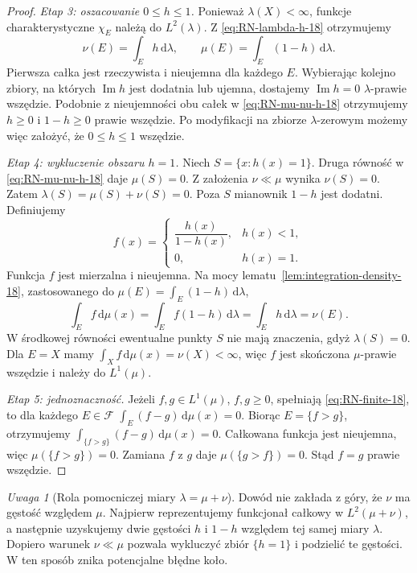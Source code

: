 \documentclass[11pt,a4paper,oneside]{book}
\numberwithin{equation}{chapter}
\theoremstyle{plain}
\theoremstyle{definition}
\theoremstyle{remark}
\newtheorem{uwaga}[twierdzenie]{Uwaga}
\begin{document}
\begin{proof}
\emph{Etap 3: oszacowanie $0\le h\le1$.}
Ponieważ $\lambda(X)<\infty$, funkcje charakterystyczne $\chi_E$
należą do $L^2(\lambda)$. Z \eqref{eq:RN-lambda-h-18}
otrzymujemy
\begin{equation}\label{eq:RN-mu-nu-h-18}
\nu(E)=\int_Eh\,\mathrm d\lambda,\qquad
\mu(E)=\int_E(1-h)\,\mathrm d\lambda.
\end{equation}
Pierwsza całka jest rzeczywista i nieujemna dla
każdego $E$. Wybierając kolejno zbiory, na których
$\operatorname{Im}h$ jest dodatnia lub ujemna,
dostajemy $\operatorname{Im}h=0$ $\lambda$-prawie wszędzie.
Podobnie z nieujemności obu całek w
\eqref{eq:RN-mu-nu-h-18} otrzymujemy
$h\ge0$ i $1-h\ge0$ prawie wszędzie.
Po modyfikacji na zbiorze $\lambda$-zerowym możemy
więc założyć, że $0\le h\le1$ wszędzie.

\emph{Etap 4: wykluczenie obszaru $h=1$.}
Niech $S=\{x:h(x)=1\}$. Druga równość
w \eqref{eq:RN-mu-nu-h-18} daje $\mu(S)=0$.
Z założenia $\nu\ll\mu$ wynika $\nu(S)=0$.
Zatem $\lambda(S)=\mu(S)+\nu(S)=0$.
Poza $S$ mianownik $1-h$ jest dodatni.
Definiujemy
\[
f(x)=\begin{cases}
\dfrac{h(x)}{1-h(x)},&h(x)<1,\\[4pt]
0,&h(x)=1.
\end{cases}
\]
Funkcja $f$ jest mierzalna i nieujemna. Na mocy
lematu~\ref{lem:integration-density-18}, zastosowanego
do $\mu(E)=\int_E(1-h)\,\mathrm d\lambda$,
\[
\int_E f\,\mathrm d\mu(x)
 =\int_E f(1-h)\,\mathrm d\lambda
 =\int_Eh\,\mathrm d\lambda
 =\nu(E).
\]
W środkowej równości ewentualne punkty $S$ nie
mają znaczenia, gdyż $\lambda(S)=0$.
Dla $E=X$ mamy $\int_Xf\,\mathrm d\mu(x)=\nu(X)<\infty$,
więc $f$ jest skończona $\mu$-prawie wszędzie
i należy do $L^1(\mu)$.

\emph{Etap 5: jednoznaczność.}
Jeżeli $f,g\in L^1(\mu)$, $f,g\ge0$, spełniają
\eqref{eq:RN-finite-18}, to dla każdego $E\in\mathcal F$
$\int_E(f-g)\,\mathrm d\mu(x)=0$.
Biorąc $E=\{f>g\}$, otrzymujemy
$\int_{\{f>g\}}(f-g)\,\mathrm d\mu(x)=0$.
Całkowana funkcja jest nieujemna, więc
$\mu(\{f>g\})=0$. Zamiana $f$ z $g$ daje
$\mu(\{g>f\})=0$. Stąd $f=g$ prawie wszędzie.
\end{proof}

\begin{uwaga}[Rola pomocniczej miary $\lambda=\mu+\nu$]
Dowód nie zakłada z góry, że $\nu$ ma gęstość względem
$\mu$. Najpierw reprezentujemy funkcjonał całkowy w
$L^2(\mu+\nu)$, a następnie uzyskujemy dwie gęstości
$h$ i $1-h$ względem tej samej miary $\lambda$.
Dopiero warunek $\nu\ll\mu$ pozwala wykluczyć
zbiór $\{h=1\}$ i podzielić te gęstości.
W ten sposób znika potencjalne błędne koło.
\end{uwaga}
\end{document}
